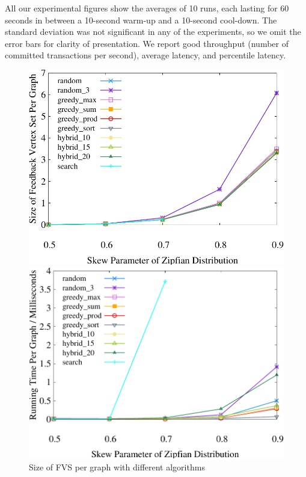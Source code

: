 
All our experimental figures show the averages of 10 runs, each lasting for 60 seconds in between a 10-second warm-up and a 10-second cool-down. The standard deviation was not significant in any of the experiments, so we omit the error bars for clarity of presentation. We report good throughput (number of committed transactions per second), average latency, and percentile latency.


\begin{figure}[t]
    \centering
    \begin{minipage}[b]{0.31\linewidth}
        \centering
        \includegraphics[width=\textwidth]{./exp_fig/fvs/fvs}
        \vspace{-2em}
        \caption{Size of FVS per graph with different algorithms}
        \label{fig:fvs:fvs}
    \end{minipage}
\quad
    \begin{minipage}[b]{0.31\linewidth}
        \centering
        \includegraphics[width=\textwidth]{./exp_fig/fvs/latency}

\end{minipage}
\end{figure}
